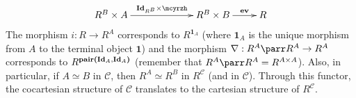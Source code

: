 \documentclass{CSML}
\newcommand*\CatC{\mathcal{C}}
\newcommand*\CatObjA{A}
\newcommand*\CatObjB{B}
\newcommand*\CatR{R}
\newcommand*\CatRC{\CatExp{\CatR}{\CatC}}
\newcommand*\CatTimes\times
\newcommand*\CatExp[2]{#1^{#2}}
\newcommand*\CatPar\parr
\newcommand*\CatCHomA\mcyrzh
\newcommand*\CatId[1]{\mathbf{Id}_{#1}}
\newcommand*\CatPair[2]{{\mathbf{pair}\bm{\left(}#1,#2\bm{\right)}}}
\newcommand*\CatEval{\mathbf{ev}}
\newcommand*\CatTerm{\mathbf{1}}
\newcommand*\CatTermMorph[1]{\mathbf{1}_{#1}}
\begin{document}
$$\xymatrix{\CatExp{\CatR}{\CatObjB}\CatTimes\CatObjA\ar[rr]^-{\CatId{\CatExp{\CatR}{\CatObjB}}\CatTimes\CatCHomA}&\hspace{10pt}&\CatExp{\CatR}{\CatObjB}\CatTimes\CatObjB\ar[r]^-{\CatEval}&\CatR}$$
The morphism $i:\CatR\to\CatExp{\CatR}{\CatObjA}$ corresponds to $\CatExp{\CatR}{\CatTermMorph{\CatObjA}}$ (where $\CatTermMorph{\CatObjA}$ is the unique morphism from $\CatObjA$ to the terminal object $\CatTerm$) and the morphism $\nabla:\CatExp{\CatR}{\CatObjA}\CatPar\CatExp{\CatR}{\CatObjA}\to\CatExp{\CatR}{\CatObjA}$ corresponds to $\CatExp{\CatR}{\CatPair{\CatId{\CatObjA}}{\CatId{\CatObjA}}}$ (remember that $\CatExp{\CatR}{\CatObjA}\CatPar\CatExp{\CatR}{\CatObjA}=\CatExp{\CatR}{\CatObjA\CatTimes\CatObjA}$). Also, in particular, if $\CatObjA\simeq\CatObjB$ in $\CatC$, then $\CatExp{\CatR}{\CatObjA}\simeq\CatExp{\CatR}{\CatObjB}$ in $\CatRC$ (and in $\CatC$). Through this functor, the cocartesian structure of $\CatC$ translates to the cartesian structure of $\CatRC$.
\end{document}
